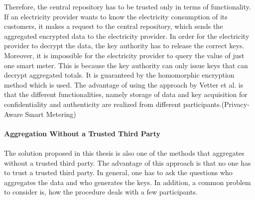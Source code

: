 Therefore, the central repository has to be trusted only in terms of functionality. If an electricity provider wants to know the electricity consumption of its customers, it makes a request to the central repository, which sends the aggregated encrypted data to the electricity provider. In order for the electricity provider to decrypt the data, the key authority has to release the correct keys. Moreover, it is impossible for the electricity provider to query the value of just one smart meter. This is because the key authority can only issue keys that can decrypt aggregated totals. It is guaranteed by the homomorphic encryption method which is used. The advantage of using the approach by Vetter et al. is that the different functionalities, namely storage of data and key acquisition for confidentiality and authenticity are realized from different participants.(Privacy-Aware Smart Metering)
\\
\\
\textbf{Aggregation Without a Trusted Third Party}
\\
\\
The solution proposed in this thesis is also one of the methods that aggregates without a trusted third party. The advantage of this approach is that no one has to trust a trusted third party. In general, one has to ask the questions who aggregates the data and who generates the keys. In addition, a common problem to consider is, how the procedure deals with a few participants. \\
